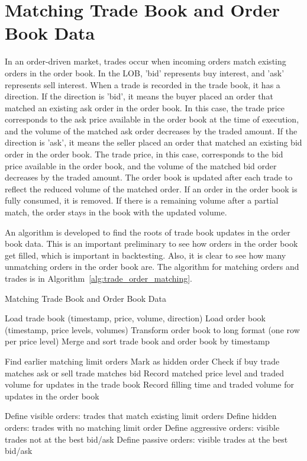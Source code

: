 \section{Matching Trade Book and Order Book Data} \label{sec:match-order-trade}
In an order-driven market, trades occur when incoming orders match existing orders in the order book. In the LOB, 'bid' represents buy interest, and 'ask' represents sell interest. When a trade is recorded in the trade book, it has a direction. If the direction is 'bid', it means the buyer placed an order that matched an existing ask order in the order book. In this case, the trade price corresponds to the ask price available in the order book at the time of execution, and the volume of the matched ask order decreases by the traded amount. If the direction is 'ask', it means the seller placed an order that matched an existing bid order in the order book. The trade price, in this case, corresponds to the bid price available in the order book, and the volume of the matched bid order decreases by the traded amount. The order book is updated after each trade to reflect the reduced volume of the matched order. If an order in the order book is fully consumed, it is removed. If there is a remaining volume after a partial match, the order stays in the book with the updated volume. 

An algorithm is developed to find the roots of trade book updates in the order book data. This is an important preliminary to see how orders in the order book get filled, which is important in backtesting. Also, it is clear to see how many unmatching orders in the order book are. The algorithm for matching orders and trades is in Algorithm~\ref{alg:trade_order_matching}.

\begin{algorithm}
    \caption{Matching Trade Book and Order Book Data}
    \label{alg:trade_order_matching}
    \begin{algorithmic}[1]
        \State Load trade book (timestamp, price, volume, direction)
        \State Load order book (timestamp, price levels, volumes)
        \State Transform order book to long format (one row per price level)
        \State Merge and sort trade book and order book by timestamp
    
            \State Find earlier matching limit orders
                \State Mark as hidden order
            \Else
                \State Check if buy trade matches ask or sell trade matches bid
                \State Record matched price level and traded volume for updates in the trade book
                \State Record filling time and traded volume for updates in the order book
            \EndIf
        \EndFor
    
        \State Define visible orders: trades that match existing limit orders
        \State Define hidden orders: trades with no matching limit order
        \State Define aggressive orders: visible trades not at the best bid/ask
        \State Define passive orders: visible trades at the best bid/ask
    
    \end{algorithmic}
\end{algorithm}

